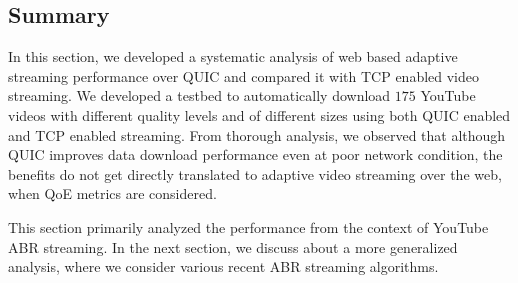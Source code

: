 \subsection{Summary}
In this section, we developed a systematic analysis of web based adaptive streaming performance over QUIC and compared it with TCP enabled video streaming. We developed a testbed to automatically download $175$ YouTube videos with different quality levels and of different sizes using both QUIC enabled and TCP enabled streaming. From thorough analysis, we observed that although QUIC improves data download performance even at poor network condition, the benefits do not get directly translated to adaptive video streaming over the web, when QoE metrics are considered. 

This section primarily analyzed the performance from the context of YouTube ABR streaming. In the next section, we discuss about a more generalized analysis, where we consider various recent ABR streaming algorithms. 